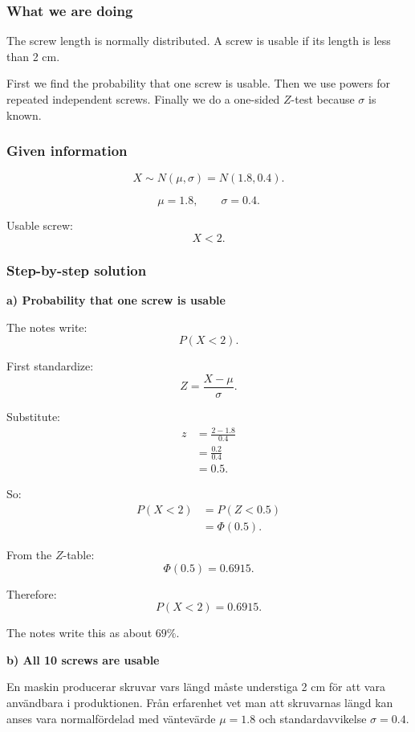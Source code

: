 \documentclass[10pt]{article}
\begin{document}
\subsubsection*{What we are doing}

The screw length is normally distributed.
A screw is usable if its length is less than 2 cm.

First we find the probability that one screw is
usable. Then we use powers for repeated independent
screws. Finally we do a one-sided \(Z\)-test because
\(\sigma\) is known.

\subsubsection*{Given information}

\[
X\sim N(\mu,\sigma)
=N(1.8,0.4).
\]

\[
\mu=1.8,
\qquad
\sigma=0.4.
\]

Usable screw:
\[
X<2.
\]

\subsubsection*{Step-by-step solution}

\textbf{a) Probability that one screw is usable}

The notes write:
\[
P(X<2).
\]

First standardize:
\[
Z=\frac{X-\mu}{\sigma}.
\]

Substitute:
\begin{align*}
z
&=
\frac{2-1.8}{0.4}
\\[2mm]
&=
\frac{0.2}{0.4}
\\[2mm]
&=0.5.
\end{align*}

So:
\begin{align*}
P(X<2)
&=
P(Z<0.5)
\\[2mm]
&=
\Phi(0.5).
\end{align*}

From the \(Z\)-table:
\[
\Phi(0.5)=0.6915.
\]

Therefore:
\[
P(X<2)=0.6915.
\]

The notes write this as about \(69\%\).

\textbf{b) All 10 screws are usable}

En maskin producerar skruvar vars längd måste
understiga 2 cm för att vara användbara i
produktionen. Från erfarenhet vet man att skruvarnas
längd kan anses vara normalfördelad med väntevärde
\(\mu=1.8\) och standardavvikelse \(\sigma=0.4\).
\end{document}

